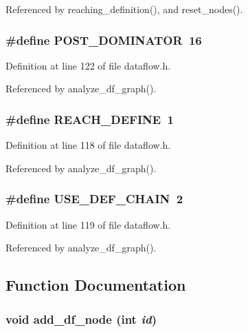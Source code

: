 Referenced by reaching\_\-definition(), and reset\_\-nodes().
\subsubsection{\setlength{\rightskip}{0pt plus 5cm}\#define POST\_\-DOMINATOR~16}\label{dataflow_8h_9b5e3b3f4899a3931284f6b236ef08d1}




Definition at line 122 of file dataflow.h.

Referenced by analyze\_\-df\_\-graph().
\subsubsection{\setlength{\rightskip}{0pt plus 5cm}\#define REACH\_\-DEFINE~1}\label{dataflow_8h_995d7799e3720ed07884f329868bb2ec}




Definition at line 118 of file dataflow.h.

Referenced by analyze\_\-df\_\-graph().
\subsubsection{\setlength{\rightskip}{0pt plus 5cm}\#define USE\_\-DEF\_\-CHAIN~2}\label{dataflow_8h_6c23f44ee3dbf3f8a4c05f5bf30fb585}




Definition at line 119 of file dataflow.h.

Referenced by analyze\_\-df\_\-graph().

\subsection{Function Documentation}
\subsubsection{\setlength{\rightskip}{0pt plus 5cm}void add\_\-df\_\-node (int {\em id})}\label{dataflow_8h_7f405d5c7c371a55362c8389ed9c4b05}




